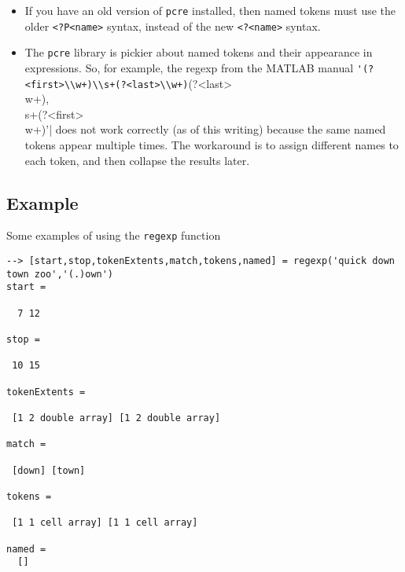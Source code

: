 \begin{itemize}
\item  If you have an old version of \verb|pcre| installed, then named tokens must use the
older \verb|<?P<name>| syntax, instead of the new \verb|<?<name>| syntax.  

\item  The \verb|pcre| library is pickier about named tokens and their appearance in 
expressions.  So, for example, the regexp from the MATLAB 
manual \verb|'(?<first>\\w+)\\s+(?<last>\\w+)|(?<last>\\w+),\\s+(?<first>\\w+)'|
does not work correctly (as of this writing) because the same named 
tokens appear multiple
times.  The workaround is to assign different names to each token, and then collapse
the results later.

\end{itemize}
\subsection{Example}

Some examples of using the \verb|regexp| function
\begin{verbatim}
--> [start,stop,tokenExtents,match,tokens,named] = regexp('quick down town zoo','(.)own')
start = 

  7 12 

stop = 

 10 15 

tokenExtents = 

 [1 2 double array] [1 2 double array] 

match = 

 [down] [town] 

tokens = 

 [1 1 cell array] [1 1 cell array] 

named = 
  []
\end{verbatim}
